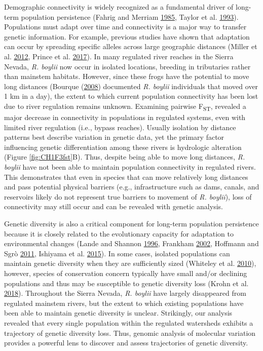 \documentclass[proquest,12pt,final]{ucthesis-CA2012} %
\begin{document}
\begin{ucmainmatter}
Demographic connectivity is widely recognized as a fundamental driver of
long-term population persistence (Fahrig and Merriam
\protect\hyperlink{ref-fahrig_habitat_1985}{1985}, Taylor et al.
\protect\hyperlink{ref-taylor_connectivity_1993}{1993}). Populations
must adapt over time and connectivity is a major way to transfer genetic
information. For example, previous studies have shown that adaptation
can occur by spreading specific alleles across large geographic
distances (Miller et al.
\protect\hyperlink{ref-miller_conserved_2012}{2012}, Prince et al.
\protect\hyperlink{ref-prince_evolutionary_2017}{2017}). In many
regulated river reaches in the Sierra Nevada, \emph{R. boylii} now occur
in isolated locations, breeding in tributaries rather than mainstem
habitats. However, since these frogs have the potential to move long
distances (Bourque (\protect\hyperlink{ref-bourque_spatial_2008}{2008})
documented \emph{R. boylii} individuals that moved over 1 km in a day),
the extent to which current population connectivity has been lost due to
river regulation remains unknown. Examining pairwise
F\textsubscript{ST}, revealed a major decrease in connectivity in
populations in regulated systems, even with limited river regulation
(i.e., bypass reaches). Usually isolation by distance patterns best
describe variation in genetic data, yet the primary factor influencing
genetic differentiation among these rivers is hydrologic alteration
(Figure \ref{fig:CH1F3fst}B). Thus, despite being able to move long
distances, \emph{R. boylii} have not been able to maintain population
connectivity in regulated rivers. This demonstrates that even in species
that can move relatively long distances and pass potential physical
barriers (e.g., infrastructure such as dams, canals, and reservoirs
likely do not represent true barriers to movement of \emph{R. boylii}),
loss of connectivity may still occur and can be revealed with genetic
analysis.

Genetic diversity is also a critical component for long-term population
persistence because it is closely related to the evolutionary capacity
for adaptation to environmental changes (Lande and Shannon
\protect\hyperlink{ref-lande_role_1996}{1996}, Frankham
\protect\hyperlink{ref-frankham_introduction_2002}{2002}, Hoffmann and
Sgrò \protect\hyperlink{ref-hoffmann_climate_2011}{2011}, Ishiyama et
al. \protect\hyperlink{ref-ishiyama_differential_2015}{2015}). In some
cases, isolated populations can maintain genetic diversity when they are
sufficiently sized (Whiteley et al.
\protect\hyperlink{ref-whiteley_genetic_2010}{2010}), however, species
of conservation concern typically have small and/or declining
populations and thus may be susceptible to genetic diversity loss (Krohn
et al. \protect\hyperlink{ref-krohn_conservation_2018}{2018}).
Throughout the Sierra Nevada, \emph{R. boylii} have largely disappeared
from regulated mainstem rivers, but the extent to which existing
populations have been able to maintain genetic diversity is unclear.
Strikingly, our analysis revealed that every single population within
the regulated watersheds exhibits a trajectory of genetic diversity
loss. Thus, genomic analysis of molecular variation provides a powerful
lens to discover and assess trajectories of genetic diversity.


\end{ucmainmatter}
\end{document}
